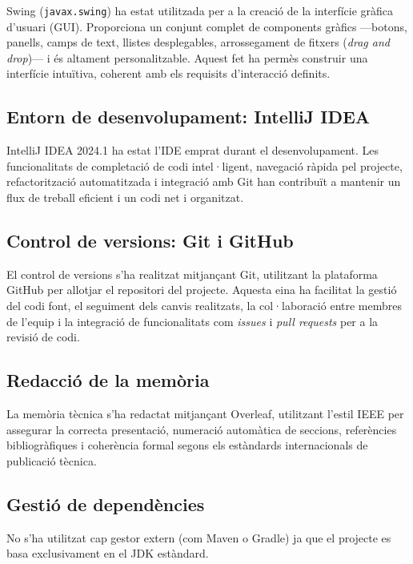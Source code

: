 \documentclass{ieeetj}
\begin{document}
Swing (\texttt{javax.swing}) \cite{swing} ha estat utilitzada per a la creació de la interfície gràfica d’usuari (GUI).  
Proporciona un conjunt complet de components gràfics —botons, panells, camps de text, llistes desplegables, arrossegament de fitxers (\emph{drag and drop})— i és altament personalitzable.  
Aquest fet ha permès construir una interfície intuïtiva, coherent amb els requisits d'interacció definits.

\subsection{Entorn de desenvolupament: IntelliJ IDEA}

IntelliJ IDEA 2024.1 ha estat l'IDE emprat durant el desenvolupament.  
Les funcionalitats de completació de codi intel·ligent, navegació ràpida pel projecte, refactorització automatitzada i integració amb Git han contribuït a mantenir un flux de treball eficient i un codi net i organitzat.

    
\subsection{Control de versions: Git i GitHub}

El control de versions s'ha realitzat mitjançant Git, utilitzant la plataforma GitHub per allotjar el repositori del projecte.  
Aquesta eina ha facilitat la gestió del codi font, el seguiment dels canvis realitzats, la col·laboració entre membres de l’equip i la integració de funcionalitats com \emph{issues} i \emph{pull requests} per a la revisió de codi.

    
\subsection{Redacció de la memòria}

La memòria tècnica s'ha redactat mitjançant Overleaf, utilitzant l'estil IEEE per assegurar la correcta presentació, numeració automàtica de seccions, referències bibliogràfiques i coherència formal segons els estàndards internacionals de publicació tècnica.

\subsection{Gestió de dependències} 
    No s’ha utilitzat cap gestor extern (com Maven o Gradle) ja que el projecte es basa exclusivament en el JDK estàndard.
\end{document}
